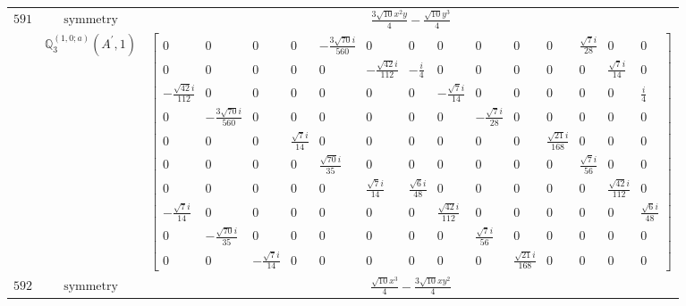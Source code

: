 \documentclass[fleqn,8pt,landscape]{jsarticle}
\begin{document}
\begin{longtable}{ccc}
$ 591 $ & $ \text{symmetry} $ & $ \frac{3 \sqrt{10} x^{2} y}{4} - \frac{\sqrt{10} y^{3}}{4} $ \\
$  $ & $ \mathbb{Q}_{3}^{(1,0;a)}(A^{\prime},1) $ & $ \begin{bmatrix} 0 & 0 & 0 & 0 & - \frac{3 \sqrt{70} i}{560} & 0 & 0 & 0 & 0 & 0 & 0 & \frac{\sqrt{7} i}{28} & 0 & 0 \\ 0 & 0 & 0 & 0 & 0 & - \frac{\sqrt{42} i}{112} & - \frac{i}{4} & 0 & 0 & 0 & 0 & 0 & \frac{\sqrt{7} i}{14} & 0 \\ - \frac{\sqrt{42} i}{112} & 0 & 0 & 0 & 0 & 0 & 0 & - \frac{\sqrt{7} i}{14} & 0 & 0 & 0 & 0 & 0 & \frac{i}{4} \\ 0 & - \frac{3 \sqrt{70} i}{560} & 0 & 0 & 0 & 0 & 0 & 0 & - \frac{\sqrt{7} i}{28} & 0 & 0 & 0 & 0 & 0 \\ 0 & 0 & 0 & \frac{\sqrt{7} i}{14} & 0 & 0 & 0 & 0 & 0 & 0 & \frac{\sqrt{21} i}{168} & 0 & 0 & 0 \\ 0 & 0 & 0 & 0 & \frac{\sqrt{70} i}{35} & 0 & 0 & 0 & 0 & 0 & 0 & \frac{\sqrt{7} i}{56} & 0 & 0 \\ 0 & 0 & 0 & 0 & 0 & \frac{\sqrt{7} i}{14} & \frac{\sqrt{6} i}{48} & 0 & 0 & 0 & 0 & 0 & \frac{\sqrt{42} i}{112} & 0 \\ - \frac{\sqrt{7} i}{14} & 0 & 0 & 0 & 0 & 0 & 0 & \frac{\sqrt{42} i}{112} & 0 & 0 & 0 & 0 & 0 & \frac{\sqrt{6} i}{48} \\ 0 & - \frac{\sqrt{70} i}{35} & 0 & 0 & 0 & 0 & 0 & 0 & \frac{\sqrt{7} i}{56} & 0 & 0 & 0 & 0 & 0 \\ 0 & 0 & - \frac{\sqrt{7} i}{14} & 0 & 0 & 0 & 0 & 0 & 0 & \frac{\sqrt{21} i}{168} & 0 & 0 & 0 & 0 \end{bmatrix} $ \\ \hline
$ 592 $ & $ \text{symmetry} $ & $ \frac{\sqrt{10} x^{3}}{4} - \frac{3 \sqrt{10} x y^{2}}{4} $ \\

\end{longtable}
\end{document}
